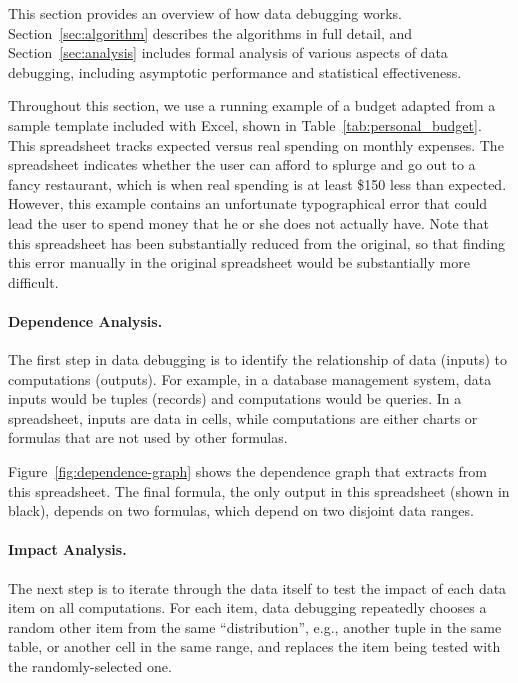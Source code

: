 This section provides an overview of how data debugging
works. Section~\ref{sec:algorithm} describes the algorithms in full
detail, and Section~\ref{sec:analysis} includes formal analysis of various
aspects of data debugging, including asymptotic performance and
statistical effectiveness.



Throughout this section, we use a running example of a budget adapted
from a sample template included with Excel, shown in
Table~\ref{tab:personal_budget}. This spreadsheet tracks expected
versus real spending on monthly expenses. The spreadsheet indicates
whether the user can afford to splurge and go out to a fancy
restaurant, which is when real spending is at least \$150 less than
expected. However, this example contains an unfortunate typographical
error that could lead the user to spend money that he or she does not
actually have. Note that this spreadsheet has been substantially
reduced from the original, so that finding this error manually in the
original spreadsheet would be substantially more difficult.

\paragraph{Dependence Analysis.}
The first step in data debugging is to identify the relationship of
data (inputs) to computations (outputs). For example, in a database
management system, data inputs would be tuples (records) and computations would
be queries. In a spreadsheet, inputs are data in cells, while
computations are either charts or formulas that are not used by other formulas.

Figure~\ref{fig:dependence-graph} shows the dependence graph that \checkcell{}
extracts from this spreadsheet. The final formula, the only output in
this spreadsheet (shown in black), depends on two formulas, which depend on two
disjoint data ranges.

\paragraph{Impact Analysis.}
The next step is to iterate through the data itself to test the impact
of each data item on all computations. For each item, data debugging
repeatedly chooses a random other item from the same ``distribution'',
e.g., another tuple in the same table, or another cell in the same
range, and replaces the item being tested with the randomly-selected
one.

